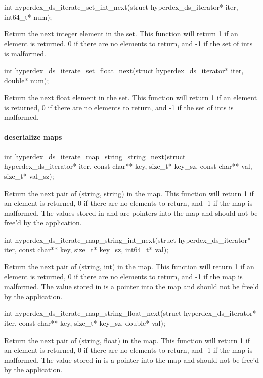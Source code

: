 \funcsep
\begin{ccode}
int hyperdex_ds_iterate_set_int_next(struct hyperdex_ds_iterator* iter, int64_t* num);
\end{ccode}
\funcdesc Return the next integer element in the set.  This function will return
1 if an element is returned, 0 if there are no elements to return, and -1 if the
set of ints is malformed.

\funcsep
\begin{ccode}
int hyperdex_ds_iterate_set_float_next(struct hyperdex_ds_iterator* iter, double* num);
\end{ccode}
\funcdesc Return the next float element in the set.  This function will return 1
if an element is returned, 0 if there are no elements to return, and -1 if the
set of ints is malformed.

\paragraph{deserialize maps}

\begin{ccode}
int hyperdex_ds_iterate_map_string_string_next(struct hyperdex_ds_iterator* iter,
                                               const char** key, size_t* key_sz,
                                               const char** val, size_t* val_sz);
\end{ccode}
\funcdesc Return the next pair of (string, string) in the map.  This function
will return 1 if an element is returned, 0 if there are no elements to return,
and -1 if the map is malformed.  The values stored in  and
 are pointers into the map and should not be free'd by the
application.

\funcsep
\begin{ccode}
int hyperdex_ds_iterate_map_string_int_next(struct hyperdex_ds_iterator* iter,
                                            const char** key, size_t* key_sz,
                                            int64_t* val);
\end{ccode}
\funcdesc Return the next pair of (string, int) in the map.  This function will
return 1 if an element is returned, 0 if there are no elements to return, and -1
if the map is malformed.  The value stored in  is a pointer into the
map and should not be free'd by the application.

\funcsep
\begin{ccode}
int hyperdex_ds_iterate_map_string_float_next(struct hyperdex_ds_iterator* iter,
                                              const char** key, size_t* key_sz,
                                              double* val);
\end{ccode}
\funcdesc Return the next pair of (string, float) in the map.  This function
will return 1 if an element is returned, 0 if there are no elements to return,
and -1 if the map is malformed.  The value stored in  is a pointer
into the map and should not be free'd by the application.

